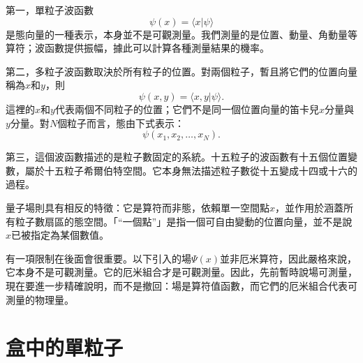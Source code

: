 第一，單粒子波函數
\begin{equation}
\psi(x)=\langle x|\psi\rangle
\end{equation}
是態向量的一種表示，本身並不是可觀測量。我們測量的是位置、動量、角動量等算符；波函數提供振幅，據此可以計算各種測量結果的機率。

第二，多粒子波函數取決於所有粒子的位置。對兩個粒子，暫且將它們的位置向量稱為\(x\)和\(y\)，則
\begin{equation}
\psi(x,y)=\langle x,y|\psi\rangle.
\end{equation}
這裡的\(x\)和\(y\)代表兩個不同粒子的位置；它們不是同一個位置向量的笛卡兒\(x\)分量與\(y\)分量。對\(N\)個粒子而言，態由下式表示：
\begin{equation}
\psi(x_1,x_2,\ldots,x_N).
\end{equation}

第三，這個波函數描述的是粒子數固定的系統。十五粒子的波函數有十五個位置變數，屬於十五粒子希爾伯特空間。它本身無法描述粒子數從十五變成十四或十六的過程。

量子場則具有相反的特徵：它是算符而非態，依賴單一空間點\(x\)，並作用於涵蓋所有粒子數扇區的態空間。「``一個點''」是指一個可自由變動的位置向量，並不是說\(x\)已被指定為某個數值。

有一項限制在後面會很重要。以下引入的場\(\Psi(x)\)並非厄米算符，因此嚴格來說，它本身不是可觀測量。它的厄米組合才是可觀測量。因此，先前暫時說場可測量，現在要進一步精確說明，而不是撤回：場是算符值函數，而它們的厄米組合代表可測量的物理量。

\begin{classroomqa}
\end{classroomqa}

\begin{classroomqa}
\end{classroomqa}

\section{盒中的單粒子}

